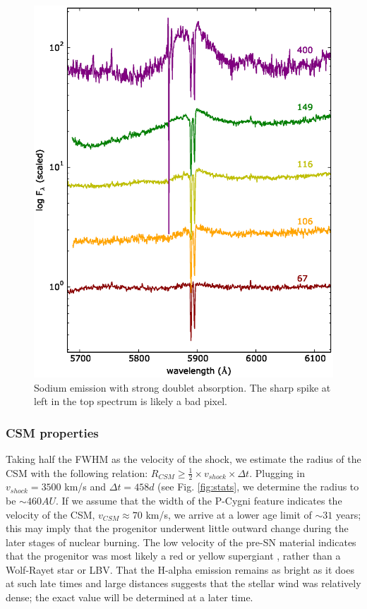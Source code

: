 \documentclass[iop]{emulateapj}
\begin{document}
\begin{figure}
  \includegraphics[width=\linewidth]{graphics/sodium.eps}
  \caption{Sodium emission with strong doublet absorption. The sharp spike at left in the top spectrum is likely a bad pixel.}
  \label{fig:sodium}
\end{figure}

\subsubsection{CSM properties} \label{analysis:spec:csm}
Taking half the FWHM as the velocity of the shock, we estimate the radius of the CSM with the following relation: $R_{CSM} \ge \frac{1}{2} \times v_{shock} \times \Delta t$. Plugging in $v_{shock} = 3500$ km/s and $\Delta t = 458 d$ (see Fig. \ref{fig:stats}, we determine the radius to be $\sim460 AU$. If we assume that the width of the P-Cygni feature indicates the velocity of the CSM, $v_{CSM} \approx 70$ km/s, we arrive at a lower age limit of $\sim31$ years; this may imply that the progenitor underwent little outward change during the later stages of nuclear burning. The low velocity of the pre-SN material indicates that the progenitor was most likely a red or yellow supergiant \citep{Smi15}, rather than a Wolf-Rayet star or LBV. That the H-alpha emission remains as bright as it does at such late times and large distances suggests that the stellar wind was relatively dense; the exact value will be determined at a later time.
\end{document}
